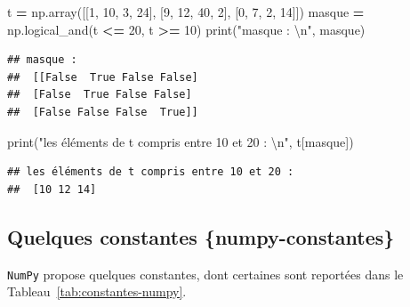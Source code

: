 \documentclass[12pt,]{book}
\newenvironment{Shaded}{\begin{snugshade}}{\end{snugshade}}
\newcommand{\DecValTok}[1]{\textcolor[rgb]{0.00,0.00,0.81}{#1}}
\newcommand{\CharTok}[1]{\textcolor[rgb]{0.31,0.60,0.02}{#1}}
\newcommand{\StringTok}[1]{\textcolor[rgb]{0.31,0.60,0.02}{#1}}
\newcommand{\OperatorTok}[1]{\textcolor[rgb]{0.81,0.36,0.00}{\textbf{#1}}}
\newcommand{\BuiltInTok}[1]{#1}
\newcommand{\NormalTok}[1]{#1}
\numberwithin{equation}{section}
\numberwithin{countremarque}{section}
\begin{document}
\begin{Shaded}
\begin{Highlighting}[]
\NormalTok{t }\OperatorTok{=}\NormalTok{ np.array([[}\DecValTok{1}\NormalTok{, }\DecValTok{10}\NormalTok{, }\DecValTok{3}\NormalTok{, }\DecValTok{24}\NormalTok{], [}\DecValTok{9}\NormalTok{, }\DecValTok{12}\NormalTok{, }\DecValTok{40}\NormalTok{, }\DecValTok{2}\NormalTok{], [}\DecValTok{0}\NormalTok{, }\DecValTok{7}\NormalTok{, }\DecValTok{2}\NormalTok{, }\DecValTok{14}\NormalTok{]])}
\NormalTok{masque }\OperatorTok{=}\NormalTok{ np.logical_and(t }\OperatorTok{<=} \DecValTok{20}\NormalTok{, t }\OperatorTok{>=} \DecValTok{10}\NormalTok{)}
\BuiltInTok{print}\NormalTok{(}\StringTok{"masque : }\CharTok{\textbackslash{}n}\StringTok{"}\NormalTok{, masque)}
\end{Highlighting}
\end{Shaded}

\begin{lstlisting}
## masque : 
##  [[False  True False False]
##  [False  True False False]
##  [False False False  True]]
\end{lstlisting}

\begin{Shaded}
\begin{Highlighting}[]
\BuiltInTok{print}\NormalTok{(}\StringTok{"les éléments de t compris entre 10 et 20 : }\CharTok{\textbackslash{}n}\StringTok{"}\NormalTok{,}
\NormalTok{      t[masque])}
\end{Highlighting}
\end{Shaded}

\begin{lstlisting}
## les éléments de t compris entre 10 et 20 : 
##  [10 12 14]
\end{lstlisting}

\subsection{Quelques constantes
\{numpy-constantes\}}\label{quelques-constantes-numpy-constantes}

\texttt{NumPy} propose quelques constantes, dont certaines sont
reportées dans le Tableau~\ref{tab:constantes-numpy}.
\end{document}
